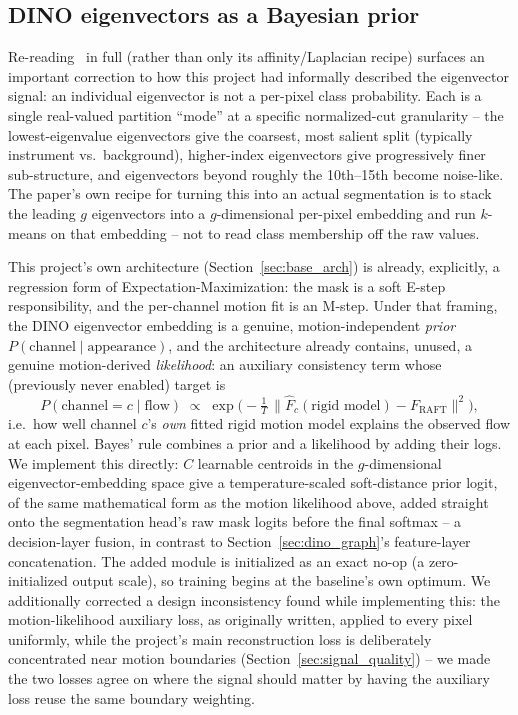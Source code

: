 \documentclass[conference]{IEEEtran}
\begin{document}
\subsection{DINO eigenvectors as a Bayesian prior}
\label{sec:bayesian_prior}

Re-reading~\cite{graphpartition_mchm2024} in full (rather than only its
affinity/Laplacian recipe) surfaces an important correction to how this
project had informally described the eigenvector signal: an individual
eigenvector is not a per-pixel class probability. Each is a single
real-valued partition ``mode'' at a specific normalized-cut granularity
-- the lowest-eigenvalue eigenvectors give the coarsest, most salient
split (typically instrument vs.\ background), higher-index eigenvectors
give progressively finer sub-structure, and eigenvectors beyond roughly
the 10th--15th become noise-like. The paper's own recipe for turning
this into an actual segmentation is to stack the leading $g$ eigenvectors
into a $g$-dimensional per-pixel embedding and run $k$-means on that
embedding -- not to read class membership off the raw values.

This project's own architecture (Section~\ref{sec:base_arch}) is already,
explicitly, a regression form of Expectation-Maximization: the mask is a
soft E-step responsibility, and the per-channel motion fit is an M-step.
Under that framing, the DINO eigenvector embedding is a genuine,
motion-independent \emph{prior} $P(\text{channel}\mid\text{appearance})$,
and the architecture already contains, unused, a genuine motion-derived
\emph{likelihood}: an auxiliary consistency term whose (previously never
enabled) target is
\[
P(\text{channel}=c \mid \text{flow}) \;\propto\;
\exp\!\Big(-\tfrac{1}{T}\,\big\lVert
\hat F_c(\text{rigid model}) - F_{\text{RAFT}} \big\rVert^2\Big),
\]
i.e.\ how well channel $c$'s \emph{own} fitted rigid motion model
explains the observed flow at each pixel. Bayes' rule combines a prior
and a likelihood by adding their logs. We implement this directly:
$C$ learnable centroids in the $g$-dimensional eigenvector-embedding
space give a temperature-scaled soft-distance prior logit, of the same
mathematical form as the motion likelihood above, added straight onto the
segmentation head's raw mask logits before the final softmax -- a
decision-layer fusion, in contrast to Section~\ref{sec:dino_graph}'s
feature-layer concatenation. The added module is initialized as an exact
no-op (a zero-initialized output scale), so training begins at the
baseline's own optimum. We additionally corrected a design inconsistency
found while implementing this: the motion-likelihood auxiliary loss, as
originally written, applied to every pixel uniformly, while the
project's main reconstruction loss is deliberately concentrated near
motion boundaries (Section~\ref{sec:signal_quality}) -- we made the two
losses agree on where the signal should matter by having the auxiliary
loss reuse the same boundary weighting.
\end{document}
